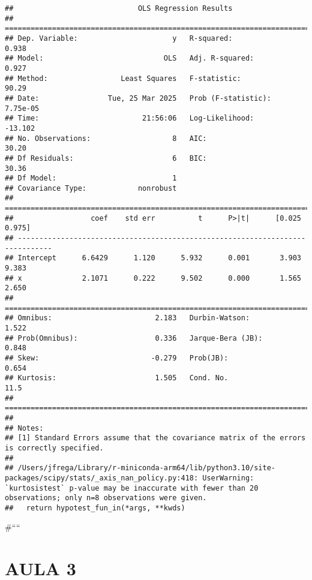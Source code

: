 \documentclass[
]{book}
\begin{document}
\begin{verbatim}
##                             OLS Regression Results                            
## ==============================================================================
## Dep. Variable:                      y   R-squared:                       0.938
## Model:                            OLS   Adj. R-squared:                  0.927
## Method:                 Least Squares   F-statistic:                     90.29
## Date:                Tue, 25 Mar 2025   Prob (F-statistic):           7.75e-05
## Time:                        21:56:06   Log-Likelihood:                -13.102
## No. Observations:                   8   AIC:                             30.20
## Df Residuals:                       6   BIC:                             30.36
## Df Model:                           1                                         
## Covariance Type:            nonrobust                                         
## ==============================================================================
##                  coef    std err          t      P>|t|      [0.025      0.975]
## ------------------------------------------------------------------------------
## Intercept      6.6429      1.120      5.932      0.001       3.903       9.383
## x              2.1071      0.222      9.502      0.000       1.565       2.650
## ==============================================================================
## Omnibus:                        2.183   Durbin-Watson:                   1.522
## Prob(Omnibus):                  0.336   Jarque-Bera (JB):                0.848
## Skew:                          -0.279   Prob(JB):                        0.654
## Kurtosis:                       1.505   Cond. No.                         11.5
## ==============================================================================
## 
## Notes:
## [1] Standard Errors assume that the covariance matrix of the errors is correctly specified.
## 
## /Users/jfrega/Library/r-miniconda-arm64/lib/python3.10/site-packages/scipy/stats/_axis_nan_policy.py:418: UserWarning: `kurtosistest` p-value may be inaccurate with fewer than 20 observations; only n=8 observations were given.
##   return hypotest_fun_in(*args, **kwds)
\end{verbatim}

\#````

\hypertarget{aula-3}{%
\chapter*{AULA 3}\label{aula-3}}
\end{document}
